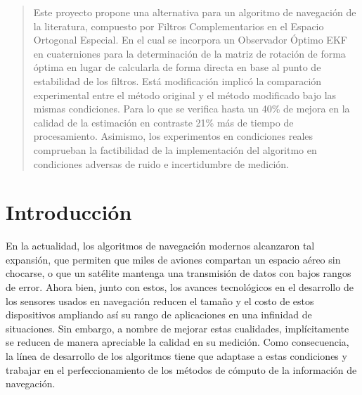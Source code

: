 \documentclass[conference]{IEEEtran}
\begin{document}




\maketitle


\begin{abstract}
Este proyecto propone una alternativa para un algoritmo de navegación de la literatura, compuesto por Filtros Complementarios en el Espacio Ortogonal Especial. En el cual se incorpora un Observador Óptimo EKF en cuaterniones para la determinación de la matriz de rotación de forma óptima en lugar de calcularla de forma directa en base al punto de estabilidad de los filtros. Está modificación implicó la comparación experimental entre el método original y el método modificado bajo las mismas condiciones. Para lo que se verifica hasta un 40\% de mejora en la calidad de la estimación en contraste 21\% más de tiempo de procesamiento. Asimismo, los experimentos en condiciones reales comprueban la factibilidad de la implementación del algoritmo en condiciones adversas de ruido e incertidumbre de medición.\end{abstract}





%
\IEEEpeerreviewmaketitle



\section{Introducción}
En la actualidad, los algoritmos de navegación modernos alcanzaron tal expansión, que permiten que miles de aviones compartan un espacio aéreo sin chocarse, o que un satélite mantenga una transmisión de datos con bajos rangos de error. Ahora bien, junto con estos, los avances tecnológicos en el desarrollo de los sensores usados en navegación reducen el tamaño y el costo de estos dispositivos ampliando así su rango de aplicaciones en una infinidad de situaciones. Sin embargo, a nombre de mejorar estas cualidades, implícitamente se reducen de manera apreciable la calidad en su medición. Como consecuencia, la línea de desarrollo de los algoritmos tiene que adaptase a estas condiciones y trabajar en el perfeccionamiento de los métodos de cómputo de la información de navegación. 
\end{document}
